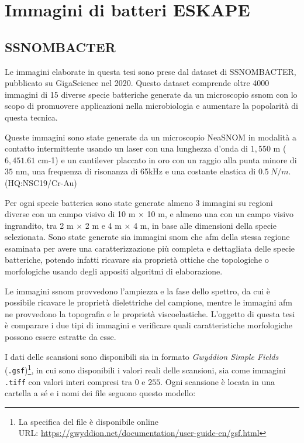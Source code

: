 \documentclass[../main.tex]{subfiles}
\begin{document}
\chapter{Immagini di batteri ESKAPE}

\section{SSNOMBACTER}

Le immagini elaborate in questa tesi sono prese dal dataset di SSNOMBACTER, pubblicato su GigaScience nel 2020. Questo dataset comprende oltre 4000 immagini di 15 diverse specie batteriche generate da un microscopio \acrshort{ssnom} con lo scopo di promuovere applicazioni nella \Gls{microbiologia} e aumentare la popolarità di questa tecnica.\cite{ssnombacter}

Queste immagini sono state generate da un microscopio NeaSNOM in modalità a contatto intermittente usando un laser con una lunghezza d'onda di $1,550$ \micro m ($6,451.61$ \gls{cm-1}) e un cantilever placcato in oro con un raggio alla punta minore di $35$ nm, una frequenza di risonanza di 65kHz e una costante elastica di $0.5\ N/m$. (HQ:NSC19/Cr-Au)\cite{micromasch}

Per ogni specie batterica sono state generate almeno 3 immagini su regioni diverse con un campo visivo di 10 \micro m × 10 \micro m, e almeno una con un campo visivo ingrandito, tra 2 \micro m × 2 \micro m e 4 \micro m × 4 \micro m, in base alle dimensioni della specie selezionata. Sono state generate sia immagini \acrshort{snom} che \acrshort{afm} della stessa regione esaminata per avere una caratterizzazione più completa e dettagliata delle specie batteriche, potendo infatti ricavare sia proprietà ottiche che topologiche o morfologiche usando degli appositi algoritmi di elaborazione. 

Le immagini \acrshort{ssnom} provvedono l'ampiezza e la fase dello spettro, da cui è possibile ricavare le proprietà dielettriche del campione, mentre le immagini \acrshort{afm} ne provvedono la topografia e le proprietà viscoelastiche. L'oggetto di questa tesi è comparare i due tipi di immagini e verificare quali caratteristiche morfologiche possono essere estratte da esse.

I dati delle scansioni sono disponibili sia in formato \textit{Gwyddion Simple Fields}\cite{gwyddion} (\texttt{.gsf})\footnote{La specifica del file è disponibile online\\URL: \url{https://gwyddion.net/documentation/user-guide-en/gsf.html}}, in cui sono disponibili i valori reali delle scansioni, sia come immagini \texttt{.tiff} con valori interi compresi tra $0$ e $255$. Ogni scansione è locata in una cartella a sé e i nomi dei file seguono questo modello:
\end{document}
